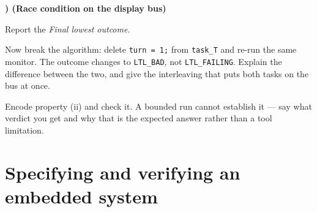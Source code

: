 \documentclass[11pt,a4paper]{article}
\newcounter{exc}
\newenvironment{exercise}[1]
  {\stepcounter{exc}\medskip\noindent\textbf{\theexc) (#1)}\par\nopagebreak\smallskip}
  {\par\medskip}
\begin{document}
\begin{exercise}{Race condition on the display bus}
\begin{parts}
        Report the \emph{Final lowest outcome}.
  \item Now break the algorithm: delete \texttt{turn = 1;} from
        \texttt{task\_T} and re-run the same monitor. The outcome changes to
        \texttt{LTL\_BAD}, not \texttt{LTL\_FAILING}. Explain the difference
        between the two, and give the interleaving that puts both tasks on the
        bus at once.
  \item Encode property (ii) and check it. A bounded run cannot establish it ---
        say what verdict you get and why that is the expected answer rather
        than a tool limitation.
\end{parts}
\end{exercise}

\section{Specifying and verifying an embedded system}
\end{document}
